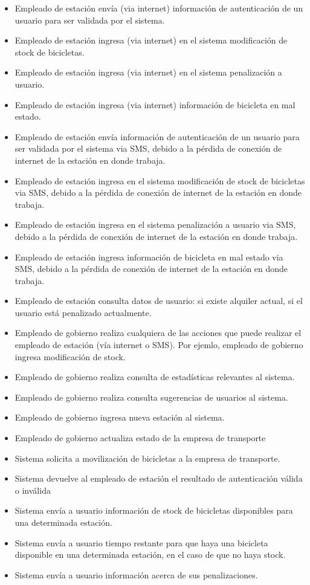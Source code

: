 \begin{itemize}

\item Empleado de estación envía (via internet) información de autenticación de un usuario para ser validada por el sistema.
\item Empleado de estación ingresa (via internet) en el sistema modificación de stock de bicicletas.
\item Empleado de estación ingresa (via internet) en el sistema penalización a usuario.
\item Empleado de estación ingresa (via internet) información de bicicleta en mal estado.
\item Empleado de estación envía información de autenticación de un usuario para ser validada por el sistema via SMS, debido
a la pérdida de conexión de internet de la estación en donde trabaja.
\item Empleado de estación ingresa en el sistema modificación de stock de bicicletas via SMS, debido
a la pérdida de conexión de internet de la estación en donde trabaja.
\item Empleado de estación ingresa en el sistema penalización a usuario via SMS, debido
a la pérdida de conexión de internet de la estación en donde trabaja.
\item Empleado de estación ingresa información de bicicleta en mal estado via SMS, debido
a la pérdida de conexión de internet de la estación en donde trabaja.
\item Empleado de estación consulta datos de usuario: si existe alquiler actual, si el usuario está penalizado
actualmente.


\item Empleado de gobierno realiza cualquiera de las acciones que puede realizar el empleado de estación (vía internet
o SMS). Por ejemlo, empleado de gobierno ingresa modificación de stock.
\item Empleado de gobierno realiza consulta de estadísticas relevantes al sistema.
\item Empleado de gobierno realiza consulta sugerencias de usuarios al sistema.
\item Empleado de gobierno ingresa nueva estación al sistema.
\item Empleado de gobierno actualiza estado de la empresa de transporte

\item Sistema solicita a movilización de bicicletas a la empresa de transporte.
\item Sistema devuelve al empleado de estación el resultado de autenticación válida o inválida
\item Sistema envía a usuario información de stock de bicicletas disponibles para una determinada estación.
\item Sistema envía a usuario tiempo restante para que haya una bicicleta disponible en una determinada estación, en el caso
de que no haya stock.
\item Sistema envía a usuario información acerca de sus penalizaciones.


\end{itemize}
